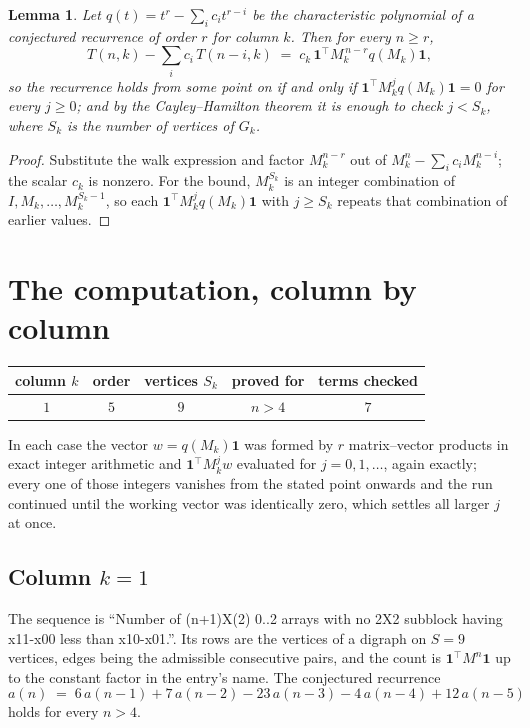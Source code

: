 \documentclass[11pt,a4paper]{article}
\theoremstyle{plain}
\newtheorem{lemma}[theorem]{Lemma}
\theoremstyle{definition}
\begin{document}
\begin{lemma}\label{lem:crit}
Let $q(t)=t^{r}-\sum_i c_it^{r-i}$ be the characteristic polynomial of a conjectured
recurrence of order $r$ for column $k$. Then for every $n\ge r$,
\[
T(n,k)-\sum_i c_i\,T(n-i,k)\;=\;c_k\,\mathbf{1}^{\!\top}M_k^{\,n-r}q(M_k)\mathbf{1},
\]
so the recurrence holds from some point on if and only if
$\mathbf{1}^{\!\top}M_k^{j}q(M_k)\mathbf{1}=0$ for every $j\ge0$; and by the
Cayley--Hamilton theorem it is enough to check $j<S_k$, where $S_k$ is the number of vertices
of $G_k$.
\end{lemma}

\begin{proof}
Substitute the walk expression and factor $M_k^{n-r}$ out of $M_k^{n}-\sum_ic_iM_k^{n-i}$;
the scalar $c_k$ is nonzero. For the bound, $M_k^{S_k}$ is an integer combination of
$I,M_k,\dots,M_k^{S_k-1}$, so each $\mathbf{1}^{\!\top}M_k^{j}q(M_k)\mathbf{1}$ with
$j\ge S_k$ repeats that combination of earlier values.
\end{proof}

\section{The computation, column by column}

\begin{center}
\begin{tabular}{ccccc}
column $k$ & order & vertices $S_k$ & proved for & terms checked \\ \hline
$1$ & $5$ & $9$ & $n>4$ & $7$ \\
\end{tabular}
\end{center}

In each case the vector $w=q(M_k)\mathbf{1}$ was formed by $r$ matrix--vector products in
exact integer arithmetic and $\mathbf{1}^{\!\top}M_k^{j}w$ evaluated for $j=0,1,\dots$,
again exactly; every one of those integers vanishes from the stated point onwards and the run
continued until the working vector was identically zero, which settles all larger $j$ at once.

\subsection*{Column $k=1$}
The sequence is ``Number of (n+1)X(2) 0..2 arrays with no 2X2 subblock having x11-x00 less than x10-x01.''. Its rows are the vertices of a digraph on
$S=9$ vertices, edges being the admissible consecutive pairs, and the count is
$\mathbf{1}^{\!\top}M^{n}\mathbf{1}$ up to the constant factor in the entry's name.
The conjectured recurrence
\[
a(n)\;=\;6\,a(n-1) + 7\,a(n-2) - 23\,a(n-3) - 4\,a(n-4) + 12\,a(n-5)
\]
holds for every $n>4$.
\end{document}
